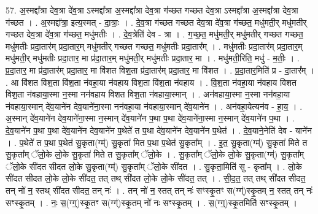 \documentclass[17pt]{extarticle}
\begin{document}
57. अ॒स्मद्दा᳚त्रा देव॒त्रा दे॑व॒त्रा ऽस्मद्दा᳚त्रा अ॒स्मद्दा᳚त्रा देव॒त्रा ग॑च्छत गच्छत देव॒त्रा ऽस्मद्दा᳚त्रा अ॒स्मद्दा᳚त्रा देव॒त्रा ग॑च्छत । . अ॒स्मद्दा᳚त्रा॒ इत्य॒स्मत् - दा॒त्राः॒ । . दे॒व॒त्रा ग॑च्छत गच्छत देव॒त्रा दे॑व॒त्रा ग॑च्छत॒ मधु॑मती॒र् मधु॑मतीर् गच्छत देव॒त्रा दे॑व॒त्रा ग॑च्छत॒ मधु॑मतीः । . दे॒व॒त्रेति॑ देव - त्रा । . ग॒च्छ॒त॒ मधु॑मती॒र् मधु॑मतीर् गच्छत गच्छत॒ मधु॑मतीः प्रदा॒तार॑म् प्रदा॒तार॒म् मधु॑मतीर् गच्छत गच्छत॒ मधु॑मतीः प्रदा॒तार᳚म् । . मधु॑मतीः प्रदा॒तार॑म् प्रदा॒तार॒म् मधु॑मती॒र् मधु॑मतीः प्रदा॒तार॒ मा प्र॑दा॒तार॒म् मधु॑मती॒र् मधु॑मतीः प्रदा॒तार॒ मा । . मधु॑मती॒रिति॒ मधु॑ - म॒तीः॒ । . प्र॒दा॒तार॒ मा प्र॑दा॒तार॑म् प्रदा॒तार॒ मा वि॑शत विश॒ता प्र॑दा॒तार॑म् प्रदा॒तार॒ मा वि॑शत । . प्र॒दा॒तार॒मिति॑ प्र - दा॒तार᳚म् । . आ वि॑शत विश॒ता वि॑श॒ता न॑वहा॒या न॑वहाय विश॒ता वि॑श॒ता न॑वहाय । . वि॒श॒ता न॑वहा॒या न॑वहाय विशत विश॒ता न॑वहाया॒स्मा न॒स्मा नन॑वहाय विशत विश॒ता न॑वहाया॒स्मान् । . अन॑वहाया॒स्मा न॒स्मा नन॑वहा॒या न॑वहाया॒स्मान् दे॑व॒याने॑न देव॒याने॑ना॒स्मा नन॑वहा॒या न॑वहाया॒स्मान् दे॑व॒याने॑न । . अन॑वहा॒येत्यन॑व - हा॒य॒ । . अ॒स्मान् दे॑व॒याने॑न देव॒याने॑ना॒स्मा न॒स्मान् दे॑व॒याने॑न प॒था प॒था दे॑व॒याने॑ना॒स्मा न॒स्मान् दे॑व॒याने॑न प॒था । . दे॒व॒याने॑न प॒था प॒था दे॑व॒याने॑न देव॒याने॑न प॒थेते॑ त प॒था दे॑व॒याने॑न देव॒याने॑न प॒थेत॑ । . दे॒व॒याने॒नेति॑ देव - याने॑न । . प॒थेते॑ त प॒था प॒थेत॑ सु॒कृता(ग्म्॑) सु॒कृता॑ मित प॒था प॒थेत॑ सु॒कृता᳚म् । . इ॒त॒ सु॒कृता(ग्म्॑) सु॒कृता॑ मिते त सु॒कृता᳚म् ॅलो॒के लो॒के सु॒कृता॑ मिते त सु॒कृता᳚म् ॅलो॒के । . सु॒कृता᳚म् ॅलो॒के लो॒के सु॒कृता(ग्म्॑) सु॒कृता᳚म् ॅलो॒के सी॑दत सीदत लो॒के सु॒कृता(ग्म्॑) सु॒कृता᳚म् ॅलो॒के सी॑दत । . सु॒कृता॒मिति॑ सु - कृता᳚म् । . लो॒के सी॑दत सीदत लो॒के लो॒के सी॑दत॒ तत् तथ् सी॑दत लो॒के लो॒के सी॑दत॒ तत् । . सी॒द॒त॒ तत् तथ् सी॑दत सीदत॒ तन् नो॑ न॒ स्तथ् सी॑दत सीदत॒ तन् नः॑ । . तन् नो॑ न॒ स्तत् तन् नः॑ सꣳस्कृ॒तꣳ स(ग्ग्॑)स्कृ॒तम् न॒ स्तत् तन् नः॑ सꣳस्कृ॒तम् । . नः॒ स॒(ग्ग्॒)स्कृ॒तꣳ स(ग्ग्॑)स्कृ॒तम् नो॑ नः सꣳस्कृ॒तम् । . स॒(ग्ग्॒)स्कृ॒तमिति॑ सꣳस्कृ॒तम् । \newline
\pagebreak
{}
\end{document}
